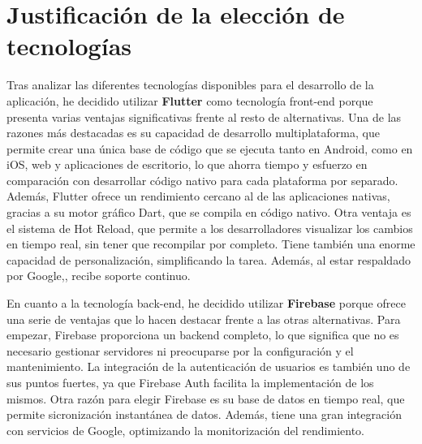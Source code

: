 \newpage


\section{Justificación de la elección de tecnologías}
\label{sec:justificacion}
Tras analizar las diferentes tecnologías disponibles para el desarrollo de la aplicación, he decidido utilizar \textbf{Flutter} como tecnología front-end 
porque presenta varias ventajas significativas frente al resto de alternativas. Una de las razones más destacadas es su capacidad de desarrollo multiplataforma, 
que permite crear una única base de código que se ejecuta tanto en Android, como en iOS, web y aplicaciones de escritorio, lo que ahorra tiempo 
y esfuerzo en comparación con desarrollar código nativo para cada plataforma por separado. Además, Flutter ofrece un rendimiento cercano al 
de las aplicaciones nativas, gracias a su motor gráfico Dart, que se compila en código nativo. Otra ventaja es el sistema de Hot Reload, que permite 
a los desarrolladores visualizar los cambios en tiempo real, sin tener que recompilar por completo. Tiene también una enorme capacidad de 
personalización, simplificando la tarea. Además, al estar respaldado por Google,, recibe soporte continuo.



En cuanto a la tecnología back-end, he decidido utilizar \textbf{Firebase} porque ofrece una serie de ventajas que lo hacen destacar frente a las
otras alternativas. Para empezar, Firebase proporciona un backend completo, lo que significa que no es necesario gestionar servidores ni 
preocuparse por la configuración y el mantenimiento. La integración de la autenticación de usuarios es también uno de sus puntos fuertes, ya que 
Firebase Auth facilita la implementación de los mismos. Otra razón para elegir Firebase es su base de datos en tiempo real, que permite 
sicronización instantánea de datos. Además, tiene una gran integración con servicios de Google, optimizando la monitorización del rendimiento.

\newpage